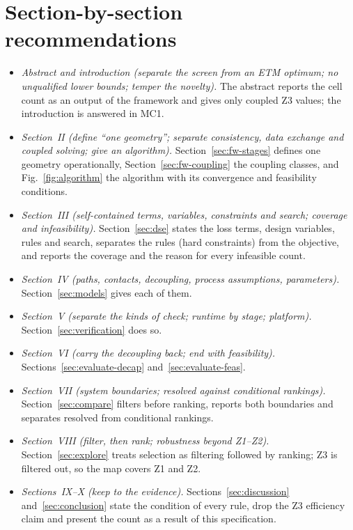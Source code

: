 \documentclass[10pt]{article}
\begin{document}
\section*{Section-by-section recommendations}
\begin{itemize}
\item \emph{Abstract and introduction (separate the screen from an ETM optimum; no unqualified
lower bounds; temper the novelty).} The abstract reports the cell count as an output of the
framework and gives only coupled Z3 values; the introduction is answered in MC1.
\item \emph{Section~II (define ``one geometry''; separate consistency, data exchange and coupled
solving; give an algorithm).} Section~\ref{sec:fw-stages} defines one geometry operationally,
Section~\ref{sec:fw-coupling} the coupling classes, and Fig.~\ref{fig:algorithm} the algorithm with
its convergence and feasibility conditions.
\item \emph{Section~III (self-contained terms, variables, constraints and search; coverage and
infeasibility).} Section~\ref{sec:dse} states the loss terms, design variables, rules and search,
separates the rules (hard constraints) from the objective, and reports the coverage and the reason for
every infeasible count.
\item \emph{Section~IV (paths, contacts, decoupling, process assumptions, parameters).}
Section~\ref{sec:models} gives each of them.
\item \emph{Section~V (separate the kinds of check; runtime by stage; platform).}
Section~\ref{sec:verification} does so.
\item \emph{Section~VI (carry the decoupling back; end with feasibility).} Sections~\ref{sec:evaluate-decap}
and~\ref{sec:evaluate-feas}.
\item \emph{Section~VII (system boundaries; resolved against conditional rankings).}
Section~\ref{sec:compare} filters before ranking, reports both boundaries and separates resolved from
conditional rankings.
\item \emph{Section~VIII (filter, then rank; robustness beyond Z1--Z2).} Section~\ref{sec:explore}
treats selection as filtering followed by ranking; Z3 is filtered out, so the map covers Z1 and Z2.
\item \emph{Sections~IX--X (keep to the evidence).} Sections~\ref{sec:discussion}
and~\ref{sec:conclusion} state the condition of every rule, drop the Z3 efficiency claim and present
the count as a result of this specification.
\end{itemize}
\end{document}
